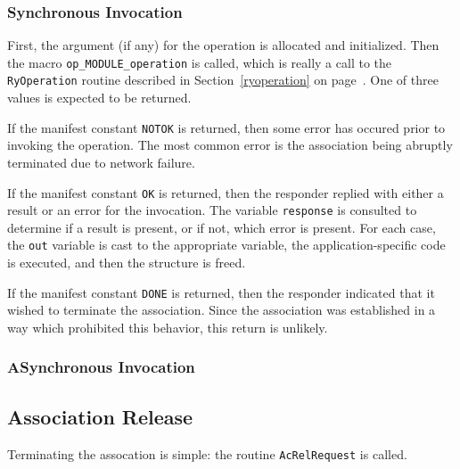 \subsubsection	{Synchronous Invocation}
First, the argument (if any) for the operation is allocated and initialized.
Then the macro \verb"op_MODULE_operation" is called,
which is really a call to the \verb"RyOperation" routine described in
Section~\ref{ryoperation} on page~\pageref{ryoperation}.
One of three values is expected to be returned.

If the manifest constant \verb"NOTOK" is returned,
then some error has occured prior to invoking the operation.
The most common error is the association being abruptly terminated due to
network failure.

If the manifest constant \verb"OK" is returned,
then the responder replied with either a result or an error for the invocation.
The variable \verb"response" is consulted to determine if a result is
present, or if not, which error is present.
For each case,
the \verb"out" variable is cast to the appropriate variable,
the application-specific code is executed,
and then the structure is freed.

If the manifest constant \verb"DONE" is returned,
then the responder indicated that it wished to terminate the association.
Since the association was established in a way which prohibited this behavior,
this return is unlikely.

\newpage

\subsubsection	{ASynchronous Invocation}

\newpage


\subsection	{Association Release}
Terminating the assocation is simple:
the routine \verb"AcRelRequest" is called.

\newpage

